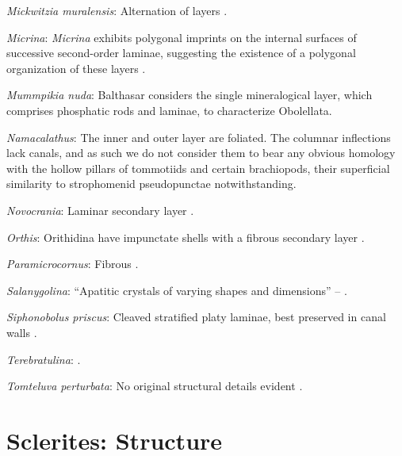 \documentclass[openany]{book}
\begin{document}
\hypertarget{Mickwitzia_muralensis-coding-132}{}
\emph{Mickwitzia muralensis}: Alternation of layers
\citep{Balthasar2004Shellstructure}.

\hypertarget{Micrina-coding-132}{}
\emph{Micrina}: \emph{Micrina} exhibits polygonal imprints on the
internal surfaces of successive second-order laminae, suggesting the
existence of a polygonal organization of these layers
\citep{Balthasar2009Homologousskeletal}.

\hypertarget{Mummpikia_nuda-coding-132}{}
\emph{Mummpikia nuda}: Balthasar \citeyearpar{Balthasar2008iMummpikia}
considers the single mineralogical layer, which comprises phosphatic
rods and laminae, to characterize Obolellata.

\hypertarget{Namacalathus-coding-132}{}
\emph{Namacalathus}: The inner and outer layer are foliated. The
columnar inflections lack canals, and as such we do not consider them to
bear any obvious homology with the hollow pillars of tommotiids and
certain brachiopods, their superficial similarity to strophomenid
pseudopunctae notwithstanding.

\hypertarget{Novocrania-coding-132}{}
\emph{Novocrania}: Laminar secondary layer \citep{Parkinson2005}.

\hypertarget{Orthis-coding-132}{}
\emph{Orthis}: Orithidina have impunctate shells with a fibrous
secondary layer \citep[p.~724]{Williams2000LinguliformeaCraniiformea}.

\hypertarget{Paramicrocornus-coding-132}{}
\emph{Paramicrocornus}: Fibrous \citep{Zhang2018Ahyolithid}.

\hypertarget{Salanygolina-coding-132}{}
\emph{Salanygolina}: ``Apatitic crystals of varying shapes and
dimensions'' -- \citet{Holmer2009Theenigmatic}.

\hypertarget{Siphonobolus_priscus-coding-132}{}
\emph{Siphonobolus priscus}: Cleaved stratified platy laminae, best
preserved in canal walls \citep{Williams2004Chemicostructure}.

\hypertarget{Terebratulina-coding-132}{}
\emph{Terebratulina}: \citet{Parkinson2005}.

\hypertarget{Tomteluva_perturbata-coding-132}{}
\emph{Tomteluva perturbata}: No original structural details evident
\citep{Streng2016Anew}.

\section{Sclerites: Structure}\label{sclerites-structure}
\end{document}
